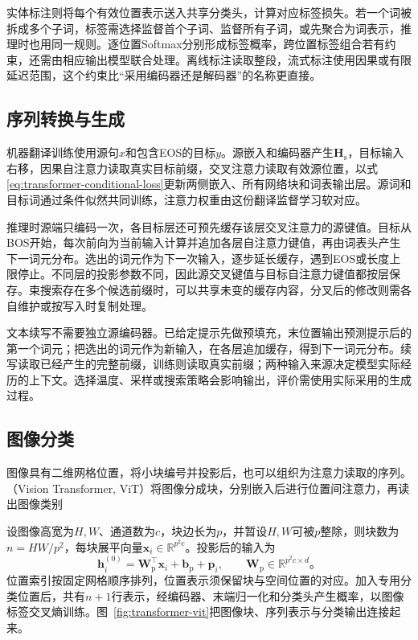 实体标注则将每个有效位置表示送入共享分类头，计算对应标签损失。若一个词被拆成多个子词，标签需选择监督首个子词、监督所有子词，或先聚合为词表示，推理时也用同一规则。逐位置Softmax分别形成标签概率，跨位置标签组合若有约束，还需由相应输出模型联合处理。离线标注读取整段，流式标注使用因果或有限延迟范围，这个约束比“采用编码器还是解码器”的名称更直接。

\subsection{序列转换与生成}
\label{sec:transformer-generation-applications}

机器翻译训练使用源句$x$和包含EOS的目标$y$。源嵌入和编码器产生$\bm H_{\mathrm s}$，目标输入右移，因果自注意力读取真实目标前缀，交叉注意力读取有效源位置，以式\eqref{eq:transformer-conditional-loss}更新两侧嵌入、所有网络块和词表输出层。源词和目标词通过条件似然共同训练，注意力权重由这份翻译监督学习软对应。

推理时源端只编码一次，各目标层还可预先缓存该层交叉注意力的源键值。目标从BOS开始，每次前向为当前输入计算并追加各层自注意力键值，再由词表头产生下一词元分布。选出的词元作为下一次输入，逐步延长缓存，遇到EOS或长度上限停止。不同层的投影参数不同，因此源交叉键值与目标自注意力键值都按层保存。束搜索存在多个候选前缀时，可以共享未变的缓存内容，分叉后的修改则需各自维护或按写入时复制处理。

文本续写不需要独立源编码器。已给定提示先做预填充，末位置输出预测提示后的第一个词元；把选出的词元作为新输入，在各层追加缓存，得到下一词元分布。续写读取已经产生的完整前缀，训练则读取真实前缀；两种输入来源决定模型实际经历的上下文。选择温度、采样或搜索策略会影响输出，评价需使用实际采用的生成过程。

\subsection{图像分类}
\label{sec:transformer-vision-applications}

图像具有二维网格位置，将小块编号并投影后，也可以组织为注意力读取的序列。（Vision Transformer, ViT）将图像分成块，分别嵌入后进行位置间注意力，再读出图像类别

设图像高宽为$H,W$、通道数为$c$，块边长为$p$，并暂设$H,W$可被$p$整除，则块数为$n=HW/p^2$，每块展平向量$\bm x_i\in\mathbb R^{p^2c}$。投影后的输入为
\begin{equation}
  \bm h_i^{(0)}=\bm W_{\mathrm p}^{\top}\bm x_i+\bm b_{\mathrm p}+\bm p_i,
  \qquad \bm W_{\mathrm p}\in\mathbb R^{p^2c\times d}\text{。}
  \label{eq:transformer-vit-input}
\end{equation}
位置索引按固定网格顺序排列，位置表示须保留块与空间位置的对应。加入专用分类位置后，共有$n+1$行表示，经编码器、末端归一化和分类头产生概率，以图像标签交叉熵训练。图~\ref{fig:transformer-vit}把图像块、序列表示与分类输出连接起来。

